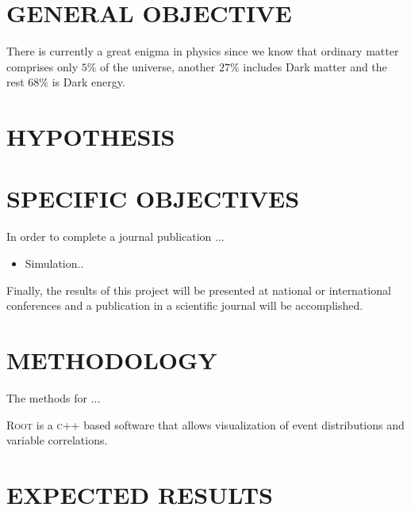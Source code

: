 \documentclass[final,3p]{CSP}
\begin{document}
\section{GENERAL OBJECTIVE}


\onehalfspacing
There is currently a great enigma in physics since we know that ordinary matter comprises only $5\%$ of the universe, another $27\%$ includes Dark matter and the rest $68\%$ is Dark energy.


\section{HYPOTHESIS}

\onehalfspacing

\section{SPECIFIC OBJECTIVES}

\onehalfspacing

In order to complete a journal publication ...

\begin{itemize}
\item Simulation..
\end{itemize}

Finally, the results of this project will be presented at national or international conferences and a publication in a scientific journal will be accomplished.


\section{METHODOLOGY}

\onehalfspacing
The methods for ...


\textsc{Root} is a \textsc{c++} based software that allows visualization of event distributions and variable correlations.


\section{EXPECTED RESULTS}
\end{document}
